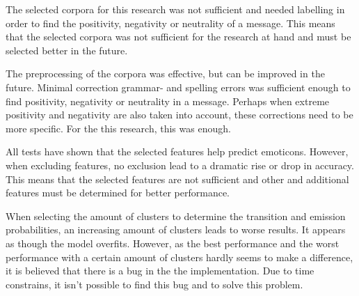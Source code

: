 The selected corpora for this research was not sufficient and needed labelling in order to find the positivity, negativity or neutrality of a message. This means that the selected corpora was not sufficient for the research at hand and must be selected better in the future.

The preprocessing of the corpora was effective, but can be improved in the future. Minimal correction grammar- and spelling errors was sufficient enough to find positivity, negativity or neutrality in a message. Perhaps when extreme positivity and negativity are also taken into account, these corrections need to be more specific. For the this research, this was enough. 

All tests have shown that the selected features help predict emoticons. However, when excluding features, no exclusion lead to a dramatic rise or drop in accuracy. This means that the selected features are not sufficient and other and additional features must be determined for better performance. 

When selecting the amount of clusters to determine the transition and emission probabilities, an increasing amount of clusters leads to worse results. It appears as though the model overfits. However, as the best performance and the worst performance with a certain amount of clusters hardly seems to make a difference, it is believed that there is a bug in the the implementation. Due to time constrains, it isn't possible to find this bug and to solve this problem.

\begin{comment}
Discussion and Conclusions (0.5 – 1 page)
• Refer to the research questions you defined in your introduction.
• Any related work you are aware of?
• Challenges you observed?
• “Future work” (you do not need to do this work really J, but what would you change in the
model / what experiments you would run / etc, if you would have a chance to do this? What other
people should look into?
• Any thoughts / observation / wider implications
\end{comment}
